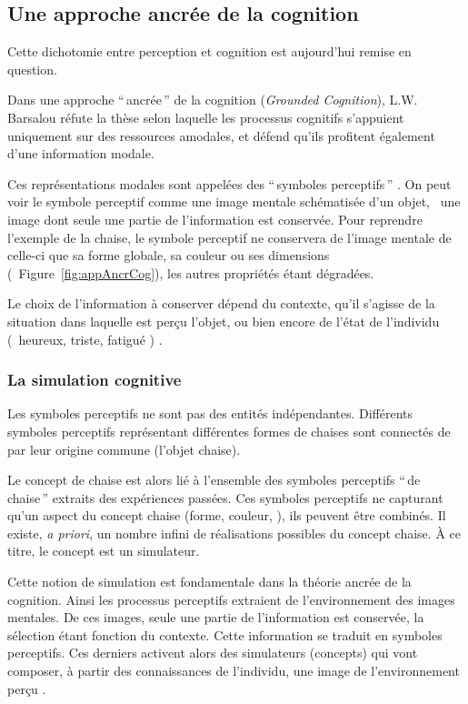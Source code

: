 \subsection{Une approche ancrée de la cognition}
\label{sec:ch3_groundedCognition}
 
Cette dichotomie entre perception et cognition est aujourd'hui remise en question. 

Dans une approche ``\,ancrée\,'' de la cognition (\emph{Grounded Cognition}), L.W. Barsalou réfute la thèse selon laquelle les processus cognitifs s'appuient uniquement sur des ressources amodales, et défend qu'ils profitent également d'une information modale.

Ces représentations modales sont appelées des ``\,symboles perceptifs\,'' \citep{barsalou1999perceptions}. On peut voir le symbole perceptif comme une image mentale schématisée d'un objet, \ie~une image dont seule une partie de l'information est conservée. Pour reprendre l'exemple de la chaise, le symbole perceptif ne conservera de l'image mentale de celle-ci que sa forme globale, sa couleur ou ses dimensions (\cf~Figure~\ref{fig:appAncrCog}), les autres propriétés étant dégradées. 

Le choix de l'information à conserver dépend du contexte, qu'il s'agisse de la situation dans laquelle est perçu l'objet, ou bien encore de l'état de l'individu (\eg~heureux, triste, fatigué \etc) \citep{barsalou2003situated}.

\subsubsection{La simulation cognitive}

Les symboles perceptifs ne sont pas des entités indépendantes. Différents symboles perceptifs représentant différentes formes de chaises sont connectés de par leur origine commune (l'objet chaise).
 
Le concept de chaise est alors lié à l'ensemble des symboles perceptifs ``\,de chaise\,'' extraits des expériences passées. Ces symboles perceptifs ne capturant qu'un aspect du concept chaise (forme, couleur, \etc), ils peuvent être combinés. Il existe, \emph{a priori}, un nombre infini de réalisations possibles du concept chaise. À ce titre, le concept est un simulateur.

Cette notion de simulation est fondamentale dans la théorie ancrée de la cognition. Ainsi les processus perceptifs extraient de l'environnement des images mentales. De ces images, seule une partie de l'information est conservée, la sélection étant fonction du contexte. Cette information se traduit en symboles perceptifs. Ces derniers activent alors des simulateurs (concepts) qui vont composer, à partir des connaissances de l'individu, une image de l'environnement perçu \citep{barsalou2003situated}.

